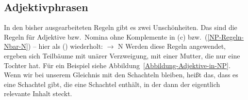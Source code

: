 


\subsection{Adjektivphrasen}



In den bisher ausgearbeiteten Regeln gibt es zwei Unschönheiten. Das sind die Regeln für Adjektive
bzw.\ Nomina ohne Komplemente in (c) bzw.\ (\ref{NP-Regeln-Nbar-N}) --  hier als () wiederholt:
\ea
\nbar $\to$ N
\z
Werden diese Regeln angewendet, ergeben sich Teilbäume mit unärer Verzweigung, \dash mit einer Mutter,
die nur eine Tochter hat. Für ein Beispiel siehe Abbildung~\ref{Abbildung-Adjektive-in-NP}. Wenn wir
bei unserem Gleichnis mit den Schachteln bleiben, heißt das, dass es eine Schachtel gibt, die eine
Schachtel enthält, in der dann der eigentlich relevante Inhalt steckt. 

